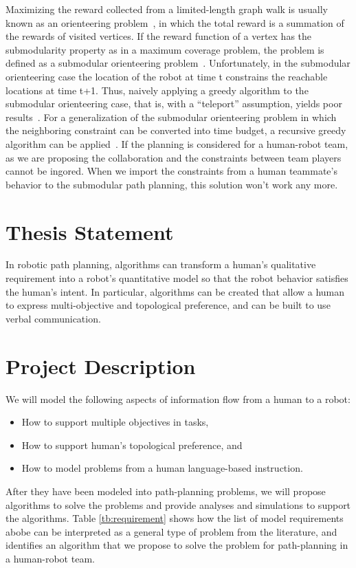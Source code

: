 \documentclass[phd]{byuprop}
\begin{document}
Maximizing the reward collected from a limited-length graph walk is usually known as an orienteering problem~\cite{Vansteenwegen2011}, in which the total reward is a summation of the rewards of visited vertices. 
If the reward function of a vertex has the submodularity property as in a maximum coverage problem, the problem is defined as a submodular orienteering problem~\cite{Chekuri2005}. 
Unfortunately, in the submodular orienteering case the location of the robot at time t constrains the reachable locations at time t+1.
Thus, naively applying a greedy algorithm to the submodular orienteering case, that is, with a “teleport” assumption, yields poor results~\cite{Krause2012}. 
For a generalization of the submodular orienteering problem in which the neighboring constraint can be converted into time budget, a recursive greedy algorithm can be applied~\cite{Chekuri2005}.
If the planning is considered for a human-robot team, as we are proposing the collaboration and the constraints between team players cannot be ingored.
When we import the constraints from a human teammate's behavior to the submodular path planning, this solution won't work any more. 


\section{Thesis Statement}
\label{sec:thesis_statement}

In robotic path planning, algorithms can transform a human's qualitative requirement into a robot's quantitative model so that the robot behavior satisfies the human's intent.
In particular, algorithms can be created that allow a human to express multi-objective and topological preference, and can be built to use verbal communication.

\section{Project Description}
\label{sec:project_description}

We will model the following aspects of information flow from a human to a robot: 
\begin{itemize}
	\item How to support multiple objectives in tasks,
	\item How to support human's topological preference, and
	\item How to model problems from a human language-based instruction.
\end{itemize}
After they have been modeled into path-planning problems, we will propose algorithms to solve the problems and provide analyses and simulations to support the algorithms.
Table \ref{tb:requirement} shows how the list of model requirements abobe can be interpreted as a general type of problem from the literature, and identifies an algorithm that we propose to solve the problem for path-planning in a human-robot team.
\end{document}
